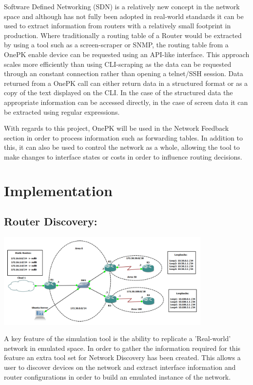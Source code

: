 \documentclass[11pt]{report}
\begin{document}
Software Defined Networking (SDN) is a relatively new concept in the network space and although has not fully been adopted in real-world standards it can be used to extract information from routers with a relatively small footprint in production. Where traditionally a routing table of a Router would be extracted by using a tool such as a screen-scraper or SNMP, the routing table from a OnePK enable device can be requested using an API-like interface. This approach scales more efficiently than using CLI-scraping as the data can be requested through an constant connection rather than opening a telnet/SSH session. Data returned from a OnePK call can either return data in a structured format or as a copy of the text displayed on the CLI. In the case of the structured data the appropriate information can be accessed directly, in the case of screen data it can be extracted using regular expressions.

With regards to this project, OnePK will be used in the Network Feedback section in order to process information such as forwarding tables. In addition to this, it can also be used to control the network as a whole, allowing the tool to make changes to interface states or costs in order to influence routing decisions.

\chapter{Implementation}

\section{Router Discovery:}

\begin{center}
\includegraphics[width=0.8\textwidth]{Lab-Design.png}
\end{center}

A key feature of the simulation tool is the ability to replicate a 'Real-world' network in emulated space. In order to gather the information required for this feature an extra tool set for Network Discovery has been created. This allows a user to discover devices on the network and extract interface information and router configurations in order to build an emulated instance of the network.
\end{document}
